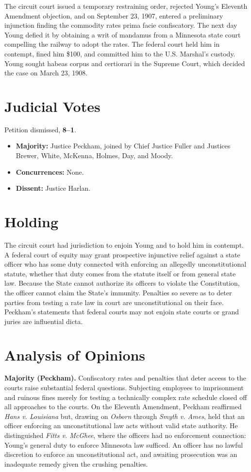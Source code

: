 \documentclass[12pt]{article}
\begin{document}
The circuit court issued a temporary restraining order, rejected Young's Eleventh Amendment objection, and on September 23, 1907, entered a preliminary injunction finding the commodity rates prima facie confiscatory. The next day Young defied it by obtaining a writ of mandamus from a Minnesota state court compelling the railway to adopt the rates. The federal court held him in contempt, fined him \$100, and committed him to the U.S. Marshal's custody. Young sought habeas corpus and certiorari in the Supreme Court, which decided the case on March 23, 1908.

\section{Judicial Votes}

Petition dismissed, \textbf{8--1}.
\begin{itemize}
\item \textbf{Majority:} Justice Peckham, joined by Chief Justice Fuller and Justices Brewer, White, McKenna, Holmes, Day, and Moody.
\item \textbf{Concurrences:} None.
\item \textbf{Dissent:} Justice Harlan.
\end{itemize}

\section{Holding}

The circuit court had jurisdiction to enjoin Young and to hold him in contempt. A federal court of equity may grant prospective injunctive relief against a state officer who has some duty connected with enforcing an allegedly unconstitutional statute, whether that duty comes from the statute itself or from general state law. Because the State cannot authorize its officers to violate the Constitution, the officer cannot claim the State's immunity. Penalties so severe as to deter parties from testing a rate law in court are unconstitutional on their face. Peckham's statements that federal courts may not enjoin state courts or grand juries are influential dicta.

\section{Analysis of Opinions}

\textbf{Majority (Peckham).} Confiscatory rates and penalties that deter access to the courts raise substantial federal questions. Subjecting employees to imprisonment and ruinous fines merely for testing a technically complex rate schedule closed off all approaches to the courts. On the Eleventh Amendment, Peckham reaffirmed \textit{Hans v. Louisiana} but, drawing on \textit{Osborn} through \textit{Smyth v. Ames}, held that an officer enforcing an unconstitutional law acts without valid state authority. He distinguished \textit{Fitts v. McGhee}, where the officers had no enforcement connection: Young's general duty to enforce Minnesota law sufficed. An officer has no lawful discretion to enforce an unconstitutional act, and awaiting prosecution was an inadequate remedy given the crushing penalties.
\end{document}
